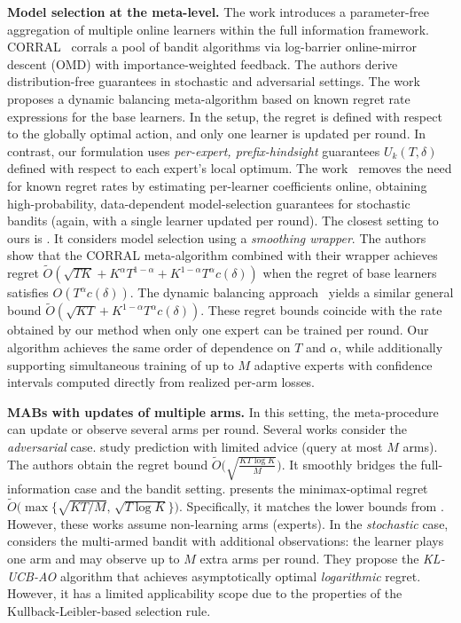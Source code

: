 \documentclass[a4paper,14pt]{extarticle}
\theoremstyle{plain}
\newcommand{\algname}[1]{{\textsf  #1}}
\begin{document}
\textbf{Model selection at the meta-level.}
The work \cite{foster2017parameter} introduces a parameter-free aggregation of multiple online learners within the full information framework. \textsc{CORRAL}~\cite{agarwal2017corralling} corrals a pool of bandit algorithms via log-barrier online-mirror descent (OMD) with importance-weighted feedback. The authors derive distribution-free guarantees in stochastic and adversarial settings. The work~\cite{cutkosky2021dynamic} proposes a dynamic balancing meta-algorithm based on known regret rate expressions for the base learners. In the setup, the regret is defined with respect to the globally optimal action, and only one learner is updated per round. In contrast, our formulation uses \emph{per-expert, prefix-hindsight} guarantees $U_k(T,\delta)$ defined with respect to each expert’s local optimum. The work~\cite{dann2024data} removes the need for known regret rates by
estimating per-learner coefficients online,
obtaining high-probability, data-dependent model-selection guarantees for stochastic bandits (again, with a single learner updated per round). The closest setting to ours is \cite{pacchiano2020model}.
It considers model selection using a \emph{smoothing wrapper}.
The authors show that the \algname{CORRAL} meta-algorithm combined with their wrapper achieves regret
$\tilde O(\sqrt{TK} + K^\alpha T^{1 - \alpha} +K^{1 - \alpha}T^{\alpha}c(\delta))$ when the regret of base learners satisfies $O(T^{\alpha}c(\delta))$.
The dynamic balancing approach~\cite{cutkosky2021dynamic} yields a similar general bound
$\tilde O\left(\sqrt{KT} + K^{1-\alpha}T^{\alpha}c(\delta)\right)$. These regret bounds coincide with the rate obtained by our method when only one expert can be trained per round. Our algorithm achieves the same order of dependence on $T$ and $\alpha$,
while additionally supporting simultaneous training of up to $M$ adaptive experts with confidence intervals computed directly from realized per-arm losses.

\textbf{MABs with updates of multiple arms.}
In this setting, the meta-procedure can update or observe several arms per round. Several works consider the \emph{adversarial} case.
\cite{seldin2014prediction} study prediction with limited advice (query at most $M$ arms).
The authors obtain the regret bound $\tilde{O}\Big(\sqrt{\tfrac{K T \log K}{M}}\Big)$.
It smoothly bridges the full-information case and the bandit setting.
\cite{yun2018multi} presents the minimax-optimal regret $\tilde O\Big(\max\{\sqrt{KT/M},\,\sqrt{T\log K}\}\Big)$. Specifically, it matches the lower bounds from \cite{seldin2014prediction}. However, these works assume non-learning arms (experts). In the \emph{stochastic} case, \cite{yun2018multi} considers the multi-armed bandit with additional observations: the learner plays one arm and may observe up to $M$ extra arms per round.
They propose the \emph{KL-UCB-AO} algorithm that achieves asymptotically optimal \emph{logarithmic} regret. However, it has a limited applicability scope due to the properties of the Kullback-Leibler-based selection rule.
\end{document}
